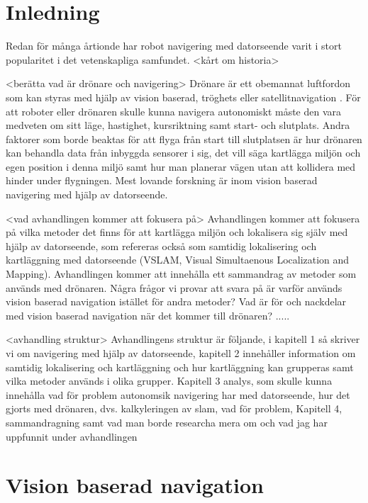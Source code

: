 
\chapter{Inledning}

Redan för många årtionde har robot navigering med datorseende varit i stort popularitet i det vetenskapliga samfundet. <kårt om historia>

<berätta vad är drönare och navigering>
Drönare är ett obemannat luftfordon som kan styras med hjälp av vision baserad, tröghets eller satellitnavigation \citep{geospatial}. För att roboter eller drönaren skulle kunna navigera autonomiskt måste den vara medveten om sitt läge, hastighet, kursriktning samt start- och slutplats. Andra faktorer som borde beaktas för att flyga från start till slutplatsen är hur drönaren kan behandla data från inbyggda sensorer i sig, det vill säga kartlägga miljön och egen position i denna miljö samt hur man planerar vägen utan att kollidera med hinder under flygningen. Mest lovande forskning är inom vision baserad navigering med hjälp av datorseende.

<vad avhandlingen kommer att fokusera på>
Avhandlingen kommer att fokusera på vilka metoder det finns för att kartlägga miljön och lokalisera sig själv med hjälp av datorseende, som refereras också som samtidig lokalisering och kartläggning med datorseende (VSLAM, Visual Simultaenous Localization and Mapping). Avhandlingen kommer att innehålla ett sammandrag av metoder som används med drönaren. Några frågor vi provar att svara på är varför används vision baserad navigation istället för andra metoder? Vad är för och nackdelar med vision baserad navigation när det kommer till drönaren? .....

<avhandling struktur>
Avhandlingens struktur är följande, i kapitell 1 så skriver vi om navigering med hjälp av datorseende, kapitell 2 innehåller information om samtidig lokalisering och kartläggning och hur kartläggning kan grupperas samt vilka metoder används i olika grupper. Kapitell 3 analys, som skulle kunna innehålla vad för problem autonomsik navigering har med datorseende, hur det gjorts med drönaren, dvs. kalkyleringen av slam, vad för problem, Kapitell 4, sammandragning samt vad man borde researcha mera om och vad jag har uppfunnit under avhandlingen

\chapter{Vision baserad navigation}

